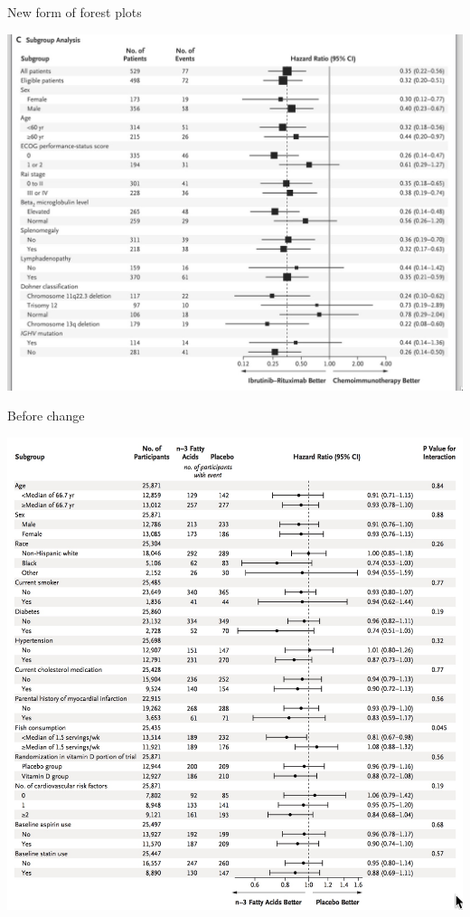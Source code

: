 \documentclass[ignorenonframetext,]{beamer}
\begin{document}
\begin{frame}{New form of forest plots}
\protect\hypertarget{new-form-of-forest-plots}{}

\centering

\includegraphics{../figures/shanafelt_subgroups.jpeg}

\end{frame}

\begin{frame}{Before change}
\protect\hypertarget{before-change}{}

\centering

\includegraphics{../figures/vital_subgroups.jpeg}

\end{frame}
\end{document}
